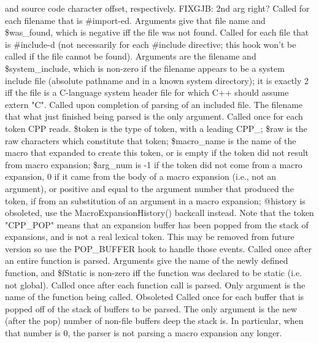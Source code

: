 and source code character offset, respectively.
 FIXGJB: 2nd arg right?
Called for each filename that is \#import-ed.  Arguments give that
file name and \$was\_\-found, which is negative iff the file was not found.
Called for each file that is \#include-d (not necessarily for each \#include
directive; this hook won't be called if the file cannot be found).
Arguments are the filename and \$system\_\-include, which is non-zero if the filename
appears to be a system include file (absolute pathname and in a known
system directory);  it is exactly 2 iff the file is a C-language
system header file for which C++ should assume extern "C".
Called upon completion of parsing of an included file.  The filename
that what just finished being parsed is the only argument.
Called once for each token CPP reads.  \$token is the type of token,
with a leading CPP\_\-; \$raw is the raw characters which constitute that
token; \$macro\_\-name is the name of the macro that expanded to create this token,
or is empty if the token did not result from macro expansion; \$arg\_\-num is -1
if the token did not come from a macro expansion, 0 if it came from the
body of a macro expansion (i.e., not an argument), or positive and equal
to the argument number that produced the token, if from an substitution
of an argument in a macro expansion; @history is obsoleted, use the
MacroExpansionHistory() backcall instead.  Note that the token "CPP\_\-POP"
means that an expansion buffer has been popped from the stack of expansions,
and is not a real lexical token.  This may be removed from future version
so use the POP\_\-BUFFER hook to handle those events.
Called once after an entire function is parsed.  Arguments
give the name of the newly defined function, and \$fStatic is non-zero
iff the function was declared to be static (i.e. not global).
Called once after each function call is parsed.  Only argument is
the name of the function being called.
 Obsoleted
Called once for each buffer that is popped off of the stack of
buffers to be parsed. The only argument is the new (after the pop)
number of non-file buffers
deep the stack is.  In particular, when that number is 0, 
the parser is not parsing a macro expansion any longer.
